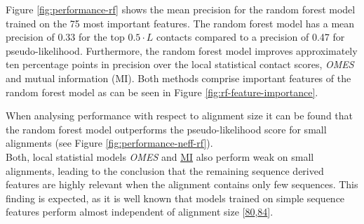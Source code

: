 \documentclass[11pt,a4paper,twoside]{book}
\theoremstyle{definition}
\theoremstyle{definition}
\theoremstyle{remark}
\begin{document}
Figure \ref{fig:performance-rf} shows the mean precision for the random
forest model trained on the 75 most important features. The random
forest model has a mean precision of 0.33 for the top \(0.5\cdot L\)
contacts compared to a precision of 0.47 for pseudo-likelihood.
Furthermore, the random forest model improves approximately ten
percentage points in precision over the local statistical contact
scores, \emph{OMES} and mutual information (MI). Both methods comprise
important features of the random forest model as can be seen in Figure
\ref{fig:rf-feature-importance}.

When analysing performance with respect to alignment size it can be
found that the random forest model outperforms the pseudo-likelihood
score for small alignments (see Figure \ref{fig:performance-neff-rf}).\\
Both, local statistial models \emph{OMES} and
\protect\hyperlink{abbrev}{MI} also perform weak on small alignments,
leading to the conclusion that the remaining sequence derived features
are highly relevant when the alignment contains only few sequences. This
finding is expected, as it is well known that models trained on simple
sequence features perform almost independent of alignment size
{[}\protect\hyperlink{ref-Skwark2016}{80},\protect\hyperlink{ref-Stahl2017}{84}{]}.
\end{document}
